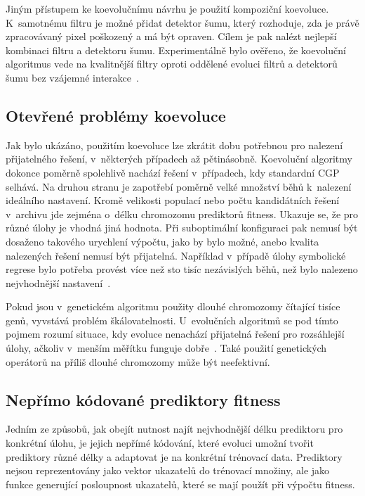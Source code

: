 Jiným přístupem ke koevolučnímu návrhu je použití kompoziční koevoluce. K~samotnému filtru je možné přidat detektor šumu, který rozhoduje, zda je právě zpracovávaný pixel poškozený a má být opraven. Cílem je pak nalézt nejlepší kombinaci filtru a detektoru šumu. Experimentálně bylo ověřeno, že koevoluční algoritmus vede na kvalitnější filtry oproti oddělené evoluci filtrů a detektorů šumu bez vzájemné interakce~\cite{SikuKomjathy}.

\subsection{Otevřené problémy koevoluce}
\label{secProblems}

Jak bylo ukázáno, použitím koevoluce lze zkrátit dobu potřebnou pro nalezení přijatelného řešení, v~některých případech až pětinásobně. Koevoluční algoritmy dokonce poměrně spolehlivě nachází řešení v~případech, kdy standardní CGP selhává. Na druhou stranu je zapotřebí poměrně velké množství běhů k~nalezení ideálního nastavení. Kromě velikosti populací nebo počtu kandidátních řešení v~archivu jde zejména o~délku chromozomu prediktorů fitness. Ukazuje se, že pro různé úlohy je vhodná jiná hodnota. Při suboptimální konfiguraci pak nemusí být dosaženo takového urychlení výpočtu, jako by bylo možné, anebo kvalita nalezených řešení nemusí být přijatelná. Například v~případě úlohy symbolické regrese bylo potřeba provést více než sto tisíc nezávislých běhů, než bylo nalezeno nejvhodnější nastavení~\cite{SikuEuroGP}.

Pokud jsou v~genetickém algoritmu použity dlouhé chromozomy čítající tisíce genů, vyvstává problém škálovatelnosti. U~evolučních algoritmů se pod tímto pojmem rozumí situace, kdy evoluce nenachází přijatelná řešení pro rozsáhlejší úlohy, ačkoliv v~menším měřítku funguje dobře~\cite{SikuKomjathy}. Také použití genetických operátorů na příliš dlouhé chromozomy může být neefektivní.


\subsection{Nepřímo kódované prediktory fitness}
\label{secIndirectPredictors}

Jedním ze způsobů, jak obejít nutnost najít nejvhodnější délku prediktoru pro konkrétní úlohu, je jejich nepřímé kódování, které evoluci umožní tvořit prediktory různé délky a adaptovat je na konkrétní trénovací data. Prediktory nejsou reprezentovány jako vektor ukazatelů do trénovací množiny, ale jako funkce generující posloupnost ukazatelů, které se mají použít při výpočtu fitness.

